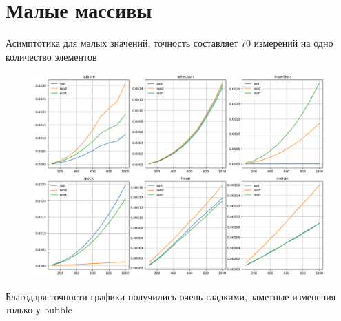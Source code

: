 \documentclass[12pt,onecolumn]{article}
\begin{document}
\section{Малые массивы}
Асимптотика для малых значений, точность составляет 70 измерений на одно количество элементов
\begin{figure}[H]
    \centering
    \includegraphics[width=1.1\textwidth]{Assets/graph6.png}
\end{figure}
Благодаря точности графики получились очень гладкими, заметные изменения только у bubble
\end{document}

